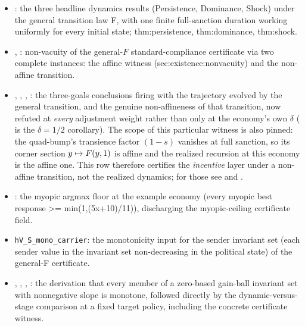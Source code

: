 \begin{itemize}[leftmargin=1.4em,itemsep=1pt]
deviation at the pivot, which the complete objective rejects, holds exactly when
$\F(\tfrac12,\tfrac34)-\F(\tfrac12,\tfrac{47}{64})>5/1152$, which a lower bound
above $5/18$ on the sanction slope implies (,
, ,
).
\item {}: the three headline dynamics results (Persistence, Dominance, Shock) under the general transition law F, with one finite full-sanction duration working uniformly for every initial state; thm:persistence, thm:dominance, thm:shock.
\item {}, :
non-vacuity of the general-$F$ standard-compliance certificate via two
complete instances: the affine witness (sec:existence:nonvacuity) and
the non-affine transition.
\item {}, , , : the three-goals conclusions firing with the trajectory evolved by the general transition, and the genuine non-affineness of that transition, now refuted at \emph{every} adjustment weight rather than only at the economy's own \(\delta\) ( is the \(\delta=1/2\) corollary). The scope of this particular witness is also pinned: the quad-bump's transience factor \((1-s)\) vanishes at full sanction, so its corner section \(y\mapsto F(y,1)\) is affine and the realized recursion at this economy is the affine one. This row therefore certifies the \emph{incentive} layer under a non-affine transition, not the realized dynamics; for those see  and .
\item {}: the myopic argmax floor at the example economy (every myopic best response \textgreater{}= min(1,(5x+10)/11)), discharging the myopic-ceiling certificate field.
\item \texttt{hV\_S\_mono\_carrier}: the monotonicity input for the sender invariant set (each sender value in the invariant set non-decreasing in the political state) of the general-F certificate.
\item {}, , , : the derivation that every member of a zero-based gain-ball invariant set with nonnegative slope is monotone, followed directly by the dynamic-versus-stage comparison at a fixed target policy, including the concrete certificate witness.

\end{itemize}
